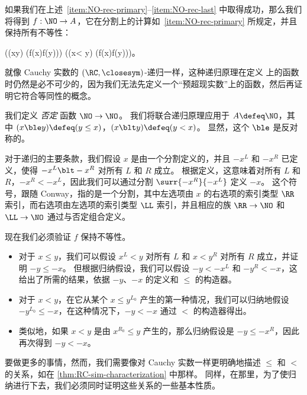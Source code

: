 如果我们在上述~\ref{item:NO-rec-primary}--\ref{item:NO-rec-last} 中取得成功，那么我们将得到 $f:\NO\to A$，它在分割上的计算如~\ref{item:NO-rec-primary} 所规定，并且保持所有不等性：
%
\begin{narrowmultline*}
  \Big((x\le y) \to (f(x)\ble f(y))\Big) \land
  \narrowbreak
  \Big((x< y) \to (f(x)\blt f(y))\Big)。
\end{narrowmultline*}
%
就像 Cauchy 实数的 $(\RC,\closesym)$-递归一样，这种递归原理在定义 \NO 上的函数时仍然是必不可少的，因为我们无法先定义一个“预超现实数”上的函数，然后再证明它符合等同性的概念。

\begin{eg}
  我们定义 \emph{否定} 函数 $\NO\to\NO$。
  我们将联合递归原理应用于 $A\defeq\NO$，其中 $(x\ble y)\defeq (y\le x)$，$(x\blt y)\defeq (y< x)$。
  显然，这个 $\ble$ 是反对称的。

  对于递归的主要条款，我们假设 $x$ 是由一个分割定义的，并且 $-x^L$ 和 $-x^R$ 已定义，使得 $-x^L \blt -x^R$ 对所有 $L$ 和 $R$ 成立。
  根据定义，这意味着对所有 $L$ 和 $R$，$-x^R< -x^L$，因此我们可以通过分割 $\surr{-x^R}{-x^L}$ 定义 $-x$。
  这个符号，跟随 Conway，指的是一个分割，其中左选项由 $x$ 的右选项的索引类型 $\RR$ 索引，而右选项由左选项的索引类型 $\LL$ 索引，并且相应的族 $\RR\to\NO$ 和 $\LL\to\NO$ 通过与否定组合定义。

  现在我们必须验证 $f$ 保持不等性。
  \begin{itemize}
    \item 对于 $x\le y$，我们可以假设 $x^L<y$ 对所有 $L$ 和 $x < y^R$ 对所有 $R$ 成立，并证明 $-y\le -x$。
    但根据归纳假设，我们可以假设 $-y <-x^L$ 和 $-y^R<-x$，这给出了所需的结果，依据 $-y$、$-x$ 的定义和 $\le$ 的构造器。
    \item 对于 $x<y$，在它从某个 $x\le y^{L_0}$ 产生的第一种情况，我们可以归纳地假设 $-y^{L_0} \le -x$，在这种情况下，$-y<-x$ 通过 $<$ 的构造器得出。
    \item 类似地，如果 $x<y$ 是由 $x^{R_0}\le y$ 产生的，那么归纳假设是 $-y \le -x^R$，因此再次得到 $-y<-x$。
  \end{itemize}
\end{eg}

要做更多的事情，然而，我们需要像对 Cauchy 实数一样更明确地描述 $\le$ 和 $<$ 的关系，如在 \cref{thm:RC-sim-characterization} 中那样。
同样，在那里，为了使归纳进行下去，我们必须同时证明这些关系的一些基本性质。

